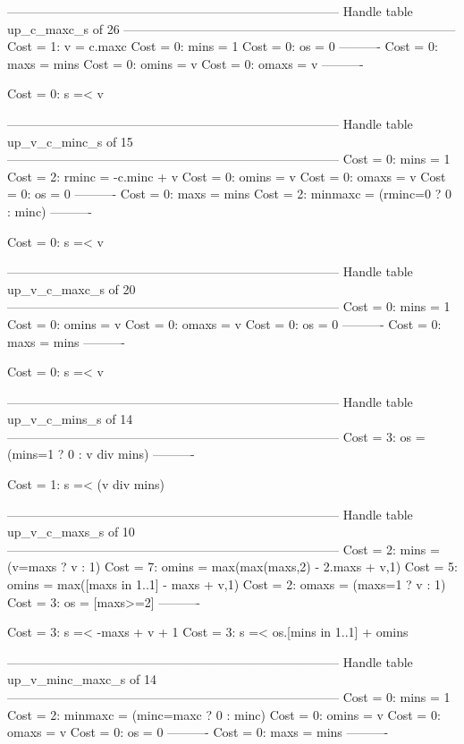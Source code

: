 --------------------------------------------------------------------------------
Handle table up_c_maxc_s of 26
--------------------------------------------------------------------------------
Cost =  1:  v     = c.maxc
Cost =  0:  mins  = 1
Cost =  0:  os    = 0
----------
Cost =  0:  maxs  = mins
Cost =  0:  omins = v
Cost =  0:  omaxs = v
----------

Cost =  0:  s =< v

--------------------------------------------------------------------------------
Handle table up_v_c_minc_s of 15
--------------------------------------------------------------------------------
Cost =  0:  mins    = 1
Cost =  2:  rminc   = -c.minc + v
Cost =  0:  omins   = v
Cost =  0:  omaxs   = v
Cost =  0:  os      = 0
----------
Cost =  0:  maxs    = mins
Cost =  2:  minmaxc = (rminc=0 ? 0 : minc)
----------

Cost =  0:  s =< v

--------------------------------------------------------------------------------
Handle table up_v_c_maxc_s of 20
--------------------------------------------------------------------------------
Cost =  0:  mins  = 1
Cost =  0:  omins = v
Cost =  0:  omaxs = v
Cost =  0:  os    = 0
----------
Cost =  0:  maxs  = mins
----------

Cost =  0:  s =< v

--------------------------------------------------------------------------------
Handle table up_v_c_mins_s of 14
--------------------------------------------------------------------------------
Cost =  3:  os = (mins=1 ? 0 : v div mins)
----------

Cost =  1:  s =< (v div mins)

--------------------------------------------------------------------------------
Handle table up_v_c_maxs_s of 10
--------------------------------------------------------------------------------
Cost =  2:  mins  = (v=maxs ? v : 1)
Cost =  7:  omins = max(max(maxs,2) - 2.maxs + v,1)
Cost =  5:  omins = max([maxs in 1..1] - maxs + v,1)
Cost =  2:  omaxs = (maxs=1 ? v : 1)
Cost =  3:  os    = [maxs>=2]
----------

Cost =  3:  s =< -maxs + v + 1
Cost =  3:  s =< os.[mins in 1..1] + omins

--------------------------------------------------------------------------------
Handle table up_v_minc_maxc_s of 14
--------------------------------------------------------------------------------
Cost =  0:  mins    = 1
Cost =  2:  minmaxc = (minc=maxc ? 0 : minc)
Cost =  0:  omins   = v
Cost =  0:  omaxs   = v
Cost =  0:  os      = 0
----------
Cost =  0:  maxs    = mins
----------

